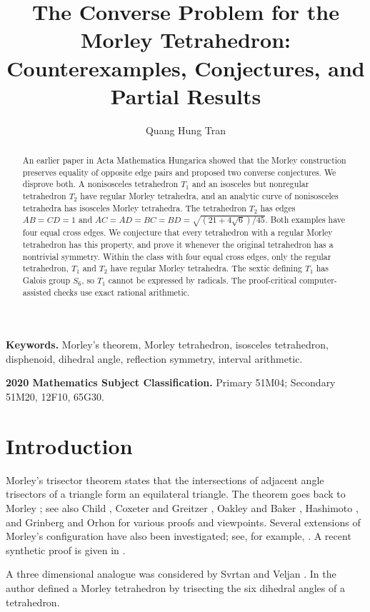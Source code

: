 \documentclass[11pt]{article}
\title{The Converse Problem for the Morley Tetrahedron:\\Counterexamples, Conjectures, and Partial Results}
\author{Quang Hung Tran}
\date{}
\theoremstyle{definition}
\theoremstyle{remark}
\begin{document}
\maketitle

\begin{abstract}
An earlier paper in Acta Mathematica Hungarica showed that the Morley construction preserves equality of opposite edge pairs and proposed two converse conjectures. We disprove both. A nonisosceles tetrahedron $T_1$ and an isosceles but nonregular tetrahedron $T_2$ have regular Morley tetrahedra, and an analytic curve of nonisosceles tetrahedra has isosceles Morley tetrahedra. The tetrahedron $T_2$ has edges $AB=CD=1$ and $AC=AD=BC=BD=\sqrt{(21+4\sqrt6)/45}$. Both examples have four equal cross edges. We conjecture that every tetrahedron with a regular Morley tetrahedron has this property, and prove it whenever the original tetrahedron has a nontrivial symmetry. Within the class with four equal cross edges, only the regular tetrahedron, $T_1$ and $T_2$ have regular Morley tetrahedra. The sextic defining $T_1$ has Galois group $S_6$, so $T_1$ cannot be expressed by radicals. The proof-critical computer-assisted checks use exact rational arithmetic.
\end{abstract}

\noindent
\textbf{Keywords.} Morley's theorem, Morley tetrahedron, isosceles tetrahedron, disphenoid, dihedral angle, reflection symmetry, interval arithmetic.

\medskip
\noindent
\textbf{2020 Mathematics Subject Classification.}
Primary 51M04; Secondary 51M20, 12F10, 65G30.

\tableofcontents

\section{Introduction}

Morley's trisector theorem states that the intersections of adjacent angle trisectors of a triangle form an equilateral triangle. The theorem goes back to Morley \cite{Morley}; see also Child \cite{Child}, Coxeter and Greitzer \cite{CoxeterGreitzer}, Oakley and Baker \cite{OakleyBaker}, Hashimoto \cite{Hashimoto}, and Grinberg and Orhon \cite{GrinbergOrhon} for various proofs and viewpoints. Several extensions of Morley's configuration have also been investigated; see, for example, \cite{Braude,DergiadesTran}. A recent synthetic proof is given in \cite{TranSynthetic}.

A three dimensional analogue was considered by Svrtan and Veljan \cite{SvrtanVeljan}. In \cite{TranActa} the author defined a Morley tetrahedron by trisecting the six dihedral angles of a tetrahedron.
\end{document}
